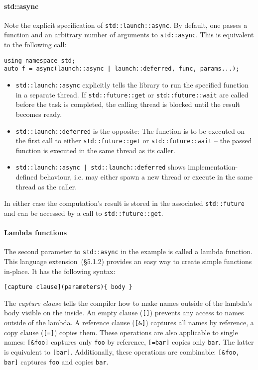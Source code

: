 \paragraph{std::async}

Note the explicit specification of \texttt{std::launch::async}. By default, one passes a function and an arbitrary number of arguments to \texttt{std::async}. This is equivalent to the following call:

\begin{verbatim}
using namespace std;
auto f = async(launch::async | launch::deferred, func, params...);
\end{verbatim}

\begin{itemize}
\item \texttt{std::launch::async} explicitly tells the library to run the specified function in a separate thread. If \texttt{std::future::get} or \texttt{std::future::wait} are called before the task is completed, the calling thread is blocked until the result becomes ready.
\item \texttt{std::launch::deferred} is the opposite: The function is to be executed on the first call to either \texttt{std::future::get} or \texttt{std::future::wait} -- the passed function is executed in the same thread as its caller.
\item \texttt{std::launch::async | std::launch::deferred} shows implementation-defined behaviour, i.e. may either spawn a new thread or execute in the same thread as the caller.
\end{itemize}

\noindent In either case the computation's result is stored in the associated \texttt{std::future} and can be accessed by a call to \texttt{std::future::get}.

\paragraph{Lambda functions}

The second parameter to \texttt{std::async} in the example is called a lambda function. This language extension~\cite{cpp11std}(§5.1.2) provides an easy way to create simple functions in-place. It has the following syntax:

\begin{verbatim}
[capture clause](parameters){ body }
\end{verbatim}

\noindent The \textit{capture clause} tells the compiler how to make names outside of the lambda's body visible on the inside. An empty clause (\texttt{[]}) prevents any access to names outside of the lambda. A reference clause (\texttt{[\&]}) captures all names by reference, a copy clause (\texttt{[=]}) copies them. These operations are also applicable to single names: \texttt{[\&foo]} captures only \texttt{foo} by reference, \texttt{[=bar]} copies only \texttt{bar}. The latter is equivalent to \texttt{[bar]}. Additionally, these operations are combinable: \texttt{[\&foo, bar]} captures \texttt{foo} and copies \texttt{bar}.

